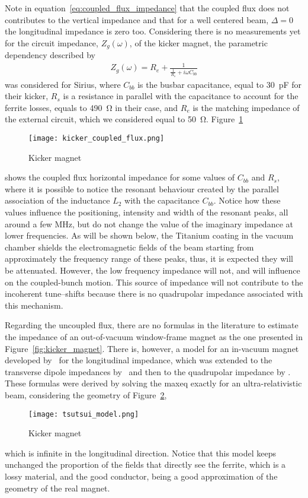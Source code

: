     Note in equation~\ref{eq:coupled_flux_impedance} that the coupled flux does not contributes to the vertical impedance and that for a well centered beam, $\Delta=0$ the longitudinal impedance is zero too. Considering there is no measurements yet for the circuit impedance, $Z_g(\omega)$, of the kicker magnet, the parametric dependency described by~
    \begin{align}
        Z_g(\omega) = R_e + \frac{1}{\frac{1}{R_s}+i\omega C_{bb}}
    \end{align}
    was considered for Sirius, where $C_{bb}$ is the busbar capacitance, equal to \SI{30}{\pico\farad} for their kicker, $R_s$ is a resistance in parallel with the capacitance to account for the ferrite losses, equals to \SI{490}{\ohm} in their case, and $R_e$ is the matching impedance of the external circuit, which we considered equal to \SI{50}{\ohm}. Figure~\ref{fig:coupled_flux_impedance}
    \begin{figure}[t!]
        \centering
        \texttt{[image: kicker\_coupled\_flux.png]}
        \caption{Kicker magnet}
        \label{fig:coupled_flux_impedance}
    \end{figure}
    shows the coupled flux horizontal impedance for some values of $C_{bb}$ and $R_s$, where it is possible to notice the resonant behaviour created by the parallel association of the inductance $L_2$ with the capacitance $C_{bb}$. Notice how these values influence the positioning, intensity and width of the resonant peaks, all around a few \si{\mega\hertz}, but do not change the value of the imaginary impedance at lower frequencies. As will be shown below, the Titanium coating in the vacuum chamber shields the electromagnetic fields of the beam starting from approximately the frequency range of these peaks, thus, it is expected they will be attenuated. However, the low frequency impedance will not, and will influence on the coupled-bunch motion. This source of impedance will not contribute to the incoherent tune--shifts because there is no quadrupolar impedance associated with this mechanism.

    Regarding the uncoupled flux, there are no formulas in the literature to estimate the impedance of an out-of-vacuum window-frame magnet as the one presented in Figure~\ref{fig:kicker_magnet}. There is, however, a model for an in-vacuum magnet developed by~ for the longitudinal impedance, which was extended to the transverse dipole impedances by~ and then to the quadrupolar impedance by . These formulas were derived by solving the \gls{maxeq} exactly for an ultra-relativistic beam, considering the geometry of Figure~\ref{fig:tsutsui_model},
    \begin{figure}[b!]
        \centering
        \texttt{[image: tsutsui\_model.png]}
        \caption{Kicker magnet}
        \label{fig:tsutsui_model}
    \end{figure}
    which is infinite in the longitudinal direction. Notice that this model keeps unchanged the proportion of the fields that directly see the ferrite, which is a lossy material, and the good conductor, being a good approximation of the geometry of the real magnet.

